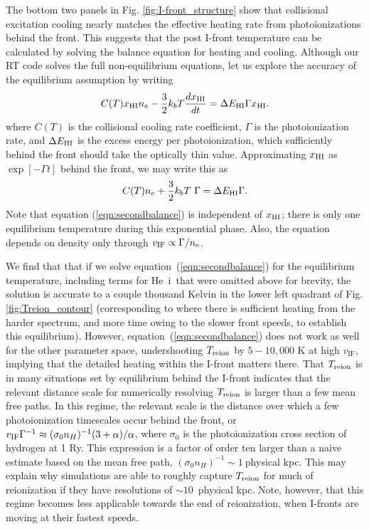 \documentclass[twocolumn]{aastex62}
\newcommand{\HeI}{He{\sc~i}}
\newcommand{\Treion}{T_{\rm reion}}
\newcommand{\vIF}{v_{\mathrm{IF}}}
\begin{document}
{
The bottom two panels in Fig. \ref{fig:I-front_structure} show that collisional excitation cooling nearly matches the effective heating rate from photoionizations behind the front.  This suggests that the post I-front temperature can be calculated by solving the balance equation for heating and cooling.  Although our RT code solves the full non-equilibrium equations, let us explore the accuracy of the equilibrium assumption by writing
\begin{equation}
C(T) x_{\rm HI} n_e - \frac{3}{2} k_b T  \frac{d x_{\rm HI}}{dt} = \Delta E_{\rm HI} \Gamma x_{\rm HI}. 
\end{equation}
where  $C(T)$ is the collisional cooling rate coefficient, $\Gamma$ is the photoionization rate, and $\Delta E_{\rm HI}$ is the excess energy per photoionization, which sufficiently behind the front should take the optically thin value. Approximating $x_{\rm HI}$ as $\exp[-\Gamma t]$ behind the front, we may write this as
\begin{equation}
C(T) n_e + \frac{3}{2} k_b T ~ \Gamma = \Delta E_{\rm HI} \Gamma. \label{eqn:secondbalance}
\end{equation}
Note that equation (\ref{eqn:secondbalance}) is independent of $x_{\rm HI}$; there is only one equilibrium temperature during this exponential phase. Also, the equation depends on density only through $v_{\rm IF} \propto \Gamma/ n_\mathrm{e}$.     

We find that that if we solve equation~(\ref{eqn:secondbalance}) for the equilibrium temperature, including terms for \HeI\ that were omitted above for brevity, the solution is accurate to a couple thousand Kelvin in the lower left quadrant of Fig. \ref{fig:Treion_contour} (corresponding to where there is sufficient heating from the harder spectrum, and more time owing to the slower front speeds, to establish this equilibrium).  However, equation~(\ref{eqn:secondbalance}) does not work as well for the other parameter space, undershooting $\Treion$ by $5-10,000$ K at high $\vIF$, implying that the detailed heating within the I-front matters there.  That $\Treion$ is in many situations set by equilibrium behind the I-front indicates that the  relevant distance scale for numerically resolving $\Treion$ is larger than a few mean free paths.  In this regime, the relevant scale is the distance over which a few photoionization timescales occur behind the front, or $ v_{\rm IF}  \Gamma^{-1} \approx (\sigma_0 n_H)^{-1} (3 +\alpha)/\alpha$, where $\sigma_0$ is the photoionization cross section of hydrogen at 1 Ry.  This expression is a factor of order ten larger than a naive estimate based on the mean free path, $(\sigma_0 n_H)^{-1}\sim1~$physical kpc.  This may explain why simulations are able to roughly capture $\Treion$ for much of reionization if they have resolutions of $\sim 10$~physical kpc.  Note, however, that this regime becomes less applicable towards the end of reionization, when I-fronts are moving at their fastest speeds. }        
\end{document}
